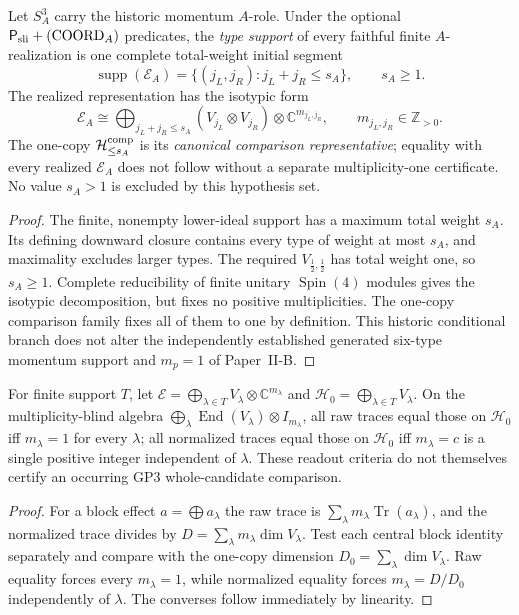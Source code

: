\documentclass[11pt,a4paper]{article}
\begin{document}
\begin{theorem}
\label{p3b:thm:legacy-factor-local-shape}
Let $S^3_A$ carry the historic momentum $A$-role. Under the optional
$\mathsf P_{\rm sli}+(\mathrm{COORD}_A)$ predicates, the \emph{type support}
of every faithful finite $A$-realization is one complete total-weight
initial segment
\[
 \operatorname{supp}(\mathcal E_A)
 =\{(j_L,j_R):j_L+j_R\le s_A\},\qquad s_A\ge1.
\]
The realized representation has the isotypic form
\[
 \mathcal E_A\cong
 \bigoplus_{j_L+j_R\le s_A}
 (V_{j_L}\otimes V_{j_R})\otimes\mathbb C^{m_{j_L,j_R}},
 \qquad m_{j_L,j_R}\in\mathbb Z_{>0}.
\]
The one-copy $\mathcal H_{\le s_A}^{\rm comp}$ is its \emph{canonical
comparison representative}; equality with every realized $\mathcal E_A$
does not follow without a separate multiplicity-one certificate.
No value $s_A>1$ is excluded by this hypothesis set.
\end{theorem}
\begin{proof}
The finite, nonempty lower-ideal support has a maximum total weight
$s_A$. Its defining downward closure contains every type of weight at most
$s_A$, and maximality excludes larger types. The required
$V_{\frac12,\frac12}$ has total weight one, so $s_A\ge1$. Complete
reducibility of finite unitary $\operatorname{Spin}(4)$ modules gives the
isotypic decomposition, but fixes no positive multiplicities.
The one-copy comparison family fixes all of them to one by definition.
This historic conditional branch does not alter the independently
established generated six-type momentum support and $m_p=1$ of Paper~II-B.
\end{proof}


\begin{proposition}
\label{p3b:prop:v1382-multiplicity-trace-criterion}
For finite support $T$, let
$\mathcal E=\bigoplus_{\lambda\in T}V_\lambda\otimes\mathbb C^{m_\lambda}$
and $\mathcal H_0=\bigoplus_{\lambda\in T}V_\lambda$.
On the multiplicity-blind algebra
$\bigoplus_\lambda\operatorname{End}(V_\lambda)\otimes I_{m_\lambda}$,
all raw traces equal those on $\mathcal H_0$ iff $m_\lambda=1$ for every
$\lambda$; all normalized traces equal those on $\mathcal H_0$ iff
$m_\lambda=c$ is a single positive integer independent of $\lambda$.
These readout criteria do not themselves certify an occurring GP3 whole-candidate comparison.
\end{proposition}
\begin{proof}
For a block effect $a=\bigoplus a_\lambda$ the raw trace is
$\sum_\lambda m_\lambda\operatorname{Tr}(a_\lambda)$, and the normalized
trace divides by $D=\sum_\lambda m_\lambda\dim V_\lambda$.
Test each central block identity separately and compare with the one-copy
dimension $D_0=\sum_\lambda\dim V_\lambda$. Raw equality forces every
$m_\lambda=1$, while normalized equality forces
$m_\lambda=D/D_0$ independently of $\lambda$. The converses follow
immediately by linearity.
\end{proof}
\end{document}
